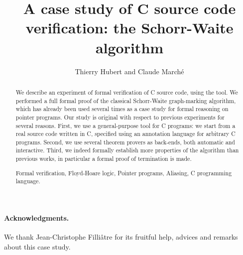 \documentclass{llncs}
\begin{document}
\sloppy

\title{A case study of C source code verification: the Schorr-Waite algorithm}
\author{Thierry Hubert and Claude March\'e}
\maketitle

\begin{abstract}
  We describe an experiment of formal verification of C source code,
  using the \caduceus{} tool. We performed a full formal proof of the
  classical Schorr-Waite graph-marking algorithm, which has already
  been used several times as a case study for formal reasoning on
  pointer programs. Our study is original with respect to previous
  experiments for several reasons. First, we use a general-purpose
  tool for C programs: we start from a real source code written in
  C, specified using an annotation language for arbitrary C programs.
  Second, we use several theorem provers as back-ends, both automatic
  and interactive.  Third, we indeed formally establish more
  properties of the algorithm than previous works, in particular a
  formal proof of termination is made.

   Formal verification, Floyd-Hoare logic,
  Pointer programs, Aliasing, C programming language.
\end{abstract}








\bigskip
\paragraph{Acknowledgments.} 
We thank Jean-Christophe Filli\^atre for its fruitful help, advices and
remarks about this case study.



\end{document}
